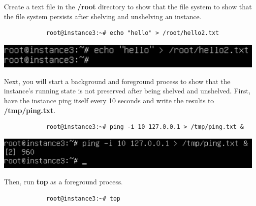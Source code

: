 \documentclass[letterpaper, 12pt]{article}
\begin{document}
\begin{enumerate}
    \begin{labstep}
        Create a text file in the \textbf{/root} directory to show that the file system to show that the file system persists after shelving and unshelving an instance.
        \begin{lstlisting}
            root@instance3:~# echo "hello" > /root/hello2.txt
        \end{lstlisting}

        \begin{center}
            \includegraphics[width=\linewidth]{images/part6/step4.png}
        \end{center}
    \end{labstep}

    \begin{labstep}
        Next, you will start a background and foreground process to show that the instance's running state is not preserved after being shelved and unshelved.
        First, have the instance ping itself every 10 seconds and write the results to \textbf{/tmp/ping.txt}.
        \begin{lstlisting}
            root@instance3:~# ping -i 10 127.0.0.1 > /tmp/ping.txt &
        \end{lstlisting}

        \begin{center}
            \includegraphics[width=\linewidth]{images/part6/step5.png}
        \end{center}
    \end{labstep}

    \begin{labstep}
        Then, run \textbf{top} as a foreground process.
        \begin{lstlisting}
            root@instance3:~# top
        \end{lstlisting}


\end{labstep}
\end{enumerate}
\end{document}
